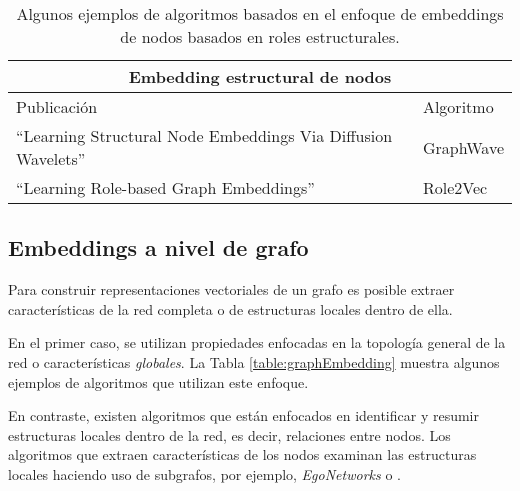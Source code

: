 \begin{table}
    \centering
\caption{Algunos ejemplos de algoritmos basados en el enfoque de embeddings de nodos basados en roles estructurales.}
\label{table:structuralNodeEmbedding}
    \begin{tabular}{ |p{8cm}|p{2cm}|  }
    \hline
    \multicolumn{2}{|c|}{Embedding estructural de nodos} \\
    \hline
    Publicación & Algoritmo  \\
    \hline
    “Learning Structural Node Embeddings Via Diffusion Wavelets” \cite{donnat_learning_2018} & GraphWave  \\
    \hline
    “Learning Role-based Graph Embeddings” \cite{ahmed_role-based_2022} & Role2Vec \\
    \hline
    \end{tabular}
\end{table}


\subsection{Embeddings a nivel de grafo}

Para construir representaciones vectoriales de un grafo es posible extraer características de la red completa o de estructuras locales dentro de ella.

En el primer caso, se utilizan propiedades enfocadas en la topología general de la red o características \emph{globales}. La Tabla \ref{table:graphEmbedding} muestra algunos ejemplos de algoritmos que utilizan este enfoque. 

En contraste, existen algoritmos que están enfocados en identificar y resumir estructuras locales dentro de la red, es decir, relaciones entre nodos. Los algoritmos que extraen características de los nodos examinan las estructuras locales haciendo uso de subgrafos, por ejemplo, \textit{EgoNetworks} o \graphlets. 

